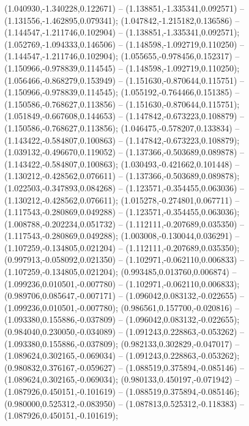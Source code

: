  (1.040930,-1.340228,0.122671) -- (1.138851,-1.335341,0.092571) -- (1.131556,-1.462895,0.079341);
 (1.047842,-1.215182,0.136586) -- (1.144547,-1.211746,0.102904) -- (1.138851,-1.335341,0.092571);
 (1.052769,-1.094333,0.146506) -- (1.148598,-1.092719,0.110250) -- (1.144547,-1.211746,0.102904);
 (1.055655,-0.978456,0.152317) -- (1.150966,-0.978839,0.114545) -- (1.148598,-1.092719,0.110250);
 (1.056466,-0.868279,0.153949) -- (1.151630,-0.870644,0.115751) -- (1.150966,-0.978839,0.114545);
 (1.055192,-0.764466,0.151385) -- (1.150586,-0.768627,0.113856) -- (1.151630,-0.870644,0.115751);
 (1.051849,-0.667608,0.144653) -- (1.147842,-0.673223,0.108879) -- (1.150586,-0.768627,0.113856);
 (1.046475,-0.578207,0.133834) -- (1.143422,-0.584807,0.100863) -- (1.147842,-0.673223,0.108879);
 (1.039132,-0.496670,0.119052) -- (1.137366,-0.503689,0.089878) -- (1.143422,-0.584807,0.100863);
 (1.030493,-0.421662,0.101448) -- (1.130212,-0.428562,0.076611) -- (1.137366,-0.503689,0.089878);
 (1.022503,-0.347893,0.084268) -- (1.123571,-0.354455,0.063036) -- (1.130212,-0.428562,0.076611);
 (1.015278,-0.274801,0.067711) -- (1.117543,-0.280869,0.049288) -- (1.123571,-0.354455,0.063036);
 (1.008788,-0.202234,0.051732) -- (1.112111,-0.207689,0.035350) -- (1.117543,-0.280869,0.049288);
 (1.003008,-0.130044,0.036291) -- (1.107259,-0.134805,0.021204) -- (1.112111,-0.207689,0.035350);
 (0.997913,-0.058092,0.021350) -- (1.102971,-0.062110,0.006833) -- (1.107259,-0.134805,0.021204);
 (0.993485,0.013760,0.006874) -- (1.099236,0.010501,-0.007780) -- (1.102971,-0.062110,0.006833);
 (0.989706,0.085647,-0.007171) -- (1.096042,0.083132,-0.022655) -- (1.099236,0.010501,-0.007780);
 (0.986561,0.157700,-0.020816) -- (1.093380,0.155886,-0.037809) -- (1.096042,0.083132,-0.022655);
 (0.984040,0.230050,-0.034089) -- (1.091243,0.228863,-0.053262) -- (1.093380,0.155886,-0.037809);
 (0.982133,0.302829,-0.047017) -- (1.089624,0.302165,-0.069034) -- (1.091243,0.228863,-0.053262);
 (0.980832,0.376167,-0.059627) -- (1.088519,0.375894,-0.085146) -- (1.089624,0.302165,-0.069034);
 (0.980133,0.450197,-0.071942) -- (1.087926,0.450151,-0.101619) -- (1.088519,0.375894,-0.085146);
 (0.980000,0.525312,-0.083950) -- (1.087813,0.525312,-0.118383) -- (1.087926,0.450151,-0.101619);
